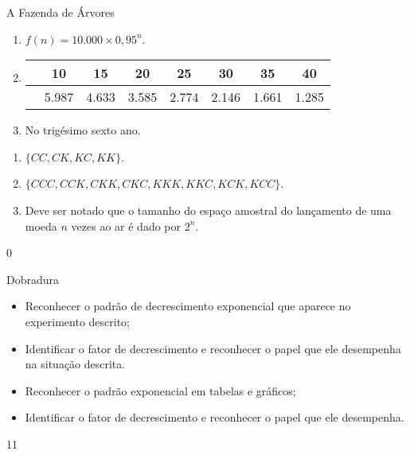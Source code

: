 \begin{answer}{A Fazenda de Árvores}
{

	\begin{enumerate}

	\item{}
	$f(n)=10.000 \times 0,95^{n}$.

	\item{}
	{
	\begin{tabular}{|>{\centering}d{.15\textwidth}|*{7}{c|}}
	\hline
	 & 10 & 15 & 20 & 25 & 30 & 35 & 40 \\
	\hline
	 & 5.987 & 4.633 & 3.585 & 2.774 & 2.146 & 1.661 & 1.285 \\
	\hline
	\end{tabular}
	}

	\item{}
	No trigésimo sexto ano.

	\end{enumerate}

	\begin{enumerate}

	\item{}
	$\{CC, CK, KC, KK\}$.

	\item{}
	$\{CCC, CCK, CKK, CKC, KKK, KKC, KCK, KCC\}$.

	\item{}
	Deve ser notado que o tamanho do espaço amostral do lançamento de uma moeda $n$ vezes ao ar é dado por $2^{n}$.

	\end{enumerate}
}{0}
\end{answer}
\begin{objectives}{Dobradura}
{
	\begin{itemize}
	\item Reconhecer o padrão de decrescimento exponencial que aparece no experimento descrito;
	\item Identificar o fator de decrescimento e reconhecer o papel que ele desempenha na situação descrita.

	\end{itemize}


	\begin{itemize}
	\item Reconhecer o padrão exponencial em tabelas e gráficos;
	\item Identificar o fator de decrescimento e reconhecer o papel que ele desempenha.
	\end{itemize}
}{1}{1}

\end{objectives}

